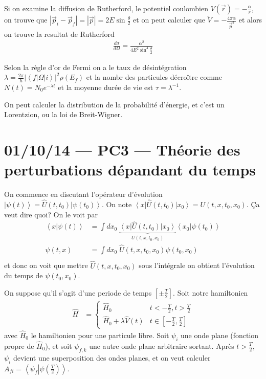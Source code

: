 \documentclass[10pt]{report}
\newcommand{\bra}[1]{\left<#1\right|}
\newcommand{\ket}[1]{\left|#1\right>}
\newcommand{\dotp}[2]{\left<#1\left.\right|#2\right>}
\newcommand{\rd}[2]{\frac{d#1}{d#2}}
\newcommand{\abs}[1]{\left|#1\right|}
\begin{document}
Si on examine la diffusion de Rutherford, le potentiel coulombien $V(\vec{r}) = -\frac{\alpha}{r}$, on trouve que $\abs{\vec{p}_i - \vec{p}_f} = \abs{\vec{p}} = 2E\sin\frac{\theta}{2}$ et on peut calculer que $\tilde{V} = -\frac{4\pi \alpha}{\vec{p}^2}$ et alors on trouve la resultat de Rutherford
\begin{align}
    \rd{\sigma}{\Omega} = \frac{\alpha^2}{4E^2\sin^4\frac{\theta}{2}}
\end{align}

Selon la r\`egle d'or de Fermi on a le taux de d\'esint\'egration $\lambda = \frac{2\pi}{\hbar}\abs{\bra{f}\Omega\ket{i}}^2\rho(E_f)$ et la nombr des particules d\'ecro\^itre comme $N(t) = N_0e^{-\lambda t}$ et la moyenne dur\'ee de vie est $\tau = \lambda^{-1}$.

On peut calculer la distribution de la probabilit\'e d'\'energie, et c'est un Lorentzion, ou la loi de Breit-Wigner.

\chapter{01/10/14 --- PC3 --- Th\'eorie des perturbations d\'epandant du temps}

On commence en discutant l'op\'erateur d'\'evolution $\ket{\psi(t)} = \hat{U}(t,t_0)\ket{\psi(t_0)}$. On note $\bra{x}\hat{U}(t,t_0)\ket{x_0} = U\left( t,x,t_0,x_0 \right)$. \c{C}a veut dire quoi? On le voit par
\begin{align}
    \dotp{x}{\psi(t)} &= \int\limits_{}^{}dx_0\;\underbrace{\bra{x}\hat{U}(t,t_0)\ket{x_0}}_{U(t,x,t_0,x_0)}\dotp{x_0}{\psi(t_0)}\\
    \psi(t,x) &= \int\limits_{}^{}dx_0\;\hat{U}(t,x,t_0,x_0 )\psi(t_0,x_0)
\end{align}
et donc on voit que mettre $\hat{U}(t,x,t_0,x_0)$ sous l'int\'egrale on obtient l'\'evolution du temps de $\psi(t_0,x_0)$. 

On suppose qu'il s'agit d'une periode de temps $\left[ \pm \frac{T}{2} \right]$. Soit notre hamiltonien
\begin{align}
    \hat{H} &= 
    \begin{cases}
        \hat{H}_0 & t < -\frac{T}{2} , t > \frac{T}{2}\\
        \hat{H}_0 + \lambda \hat{V}(t) & t \in \left[ -\frac{T}{2}, \frac{T}{2} \right]
    \end{cases}
\end{align}
avec $\hat{H}_0$ le hamiltonien pour une particule libre. Soit $\psi_{i}$ une onde plane (fonction propre de $\hat{H}_0$), et soit $\psi_{f,k}$ une autre onde plane arbitraire sortant. Apr\`es $t > \frac{T}{2}$, $\psi_i$ devient une superposition des ondes planes, et on veut calculer $A_{fi} = \dotp{\psi_f}{\psi\left( \frac{T}{2} \right)}$. 
\end{document}
